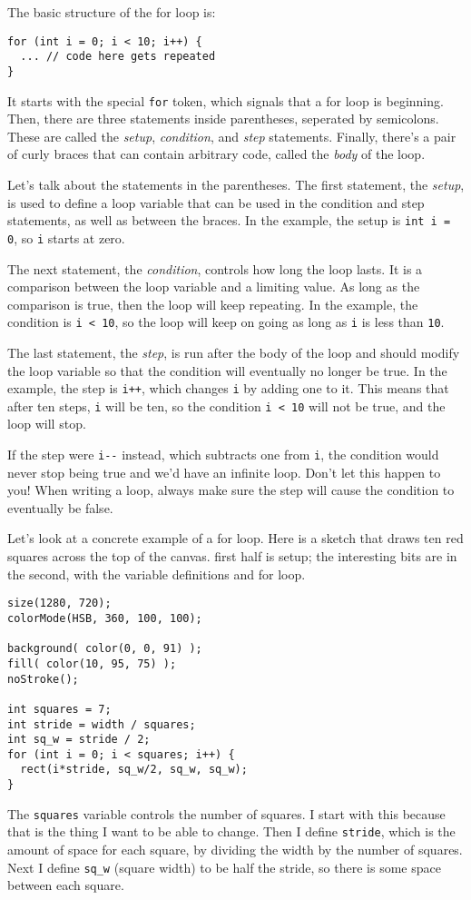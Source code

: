 \documentclass[
]{leaflet}
\begin{document}
The basic structure of the for loop is:
\begin{lstlisting}
for (int i = 0; i < 10; i++) {
  ... // code here gets repeated
}
\end{lstlisting}
It starts with the special \texttt{for} token, which signals that a for loop is beginning.
Then, there are three statements inside parentheses, seperated by semicolons.
These are called the \textit{setup}, \textit{condition}, and \textit{step} statements.
Finally, there's a pair of curly braces that can contain arbitrary code, called the \textit{body} of the loop.

Let's talk about the statements in the parentheses.
The first statement, the \textit{setup}, is used to define a loop variable that can be used in the condition and step statements, as well as between the braces.
In the example, the setup is \texttt{int i = 0}, so \texttt{i} starts at zero.

The next statement, the \textit{condition}, controls how long the loop lasts.
It is a comparison between the loop variable and a limiting value.
As long as the comparison is true, then the loop will keep repeating.
In the example, the condition is \texttt{i < 10}, so the loop will keep on going as long as \texttt{i} is less than \texttt{10}.

The last statement, the \textit{step}, is run after the body of the loop and should modify the loop variable so that the condition will eventually no longer be true.
In the example, the step is \texttt{i++}, which changes \texttt{i} by adding one to it.
This means that after ten steps, \texttt{i} will be ten, so the condition \texttt{i < 10} will not be true, and the loop will stop.

If the step were \texttt{i-}\texttt{-} instead, which subtracts one from \texttt{i}, the condition would never stop being true and we'd have an infinite loop.
Don't let this happen to you!
When writing a loop, always make sure the step will cause the condition to eventually be false.

Let's look at a concrete example of a for loop.
Here is a sketch that draws ten red squares across the top of the canvas.
 first half is setup; the interesting bits are in the second, with the variable definitions and for loop.
\begin{lstlisting}
size(1280, 720);
colorMode(HSB, 360, 100, 100);

background( color(0, 0, 91) );
fill( color(10, 95, 75) );
noStroke();

int squares = 7;
int stride = width / squares;
int sq_w = stride / 2;
for (int i = 0; i < squares; i++) {
  rect(i*stride, sq_w/2, sq_w, sq_w);
}
\end{lstlisting}
The \texttt{squares} variable controls the number of squares.
I start with this because that is the thing I want to be able to change.
Then I define \texttt{stride}, which is the amount of space for each square, by dividing the width by the number of squares.
Next I define \texttt{sq\_w} (square width) to be half the stride, so there is some space between each square.
\end{document}

